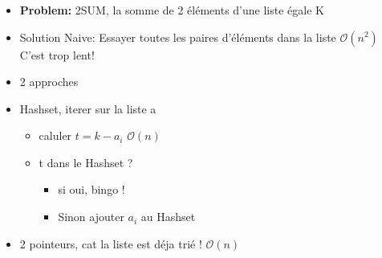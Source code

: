 \begin{frame}
    \frametitle{\problemtitle}
    \begin{itemize}
        \item<+-> \textbf{Problem:} 2SUM, la somme de 2 éléments d'une liste égale K
        \item<+-> Solution Naive: Essayer toutes les paires d'éléments dans la liste $\mathcal O(n^2)$ C'est trop lent!
        \item<+-> 2 approches
        \item<+-> Hashset, iterer sur la liste a
        \begin{itemize}
            \item<+-> caluler $t = k - a_i$ $\mathcal O(n)$
            \item<+-> t dans le Hashset ? 
            \begin{itemize}
                \item si oui, bingo !
                \item Sinon ajouter $a_i$ au Hashset
            \end{itemize}
        \end{itemize}
        \item<+-> 2 pointeurs, cat la liste est déja trié ! $\mathcal O(n)$
    \end{itemize}
\end{frame}
